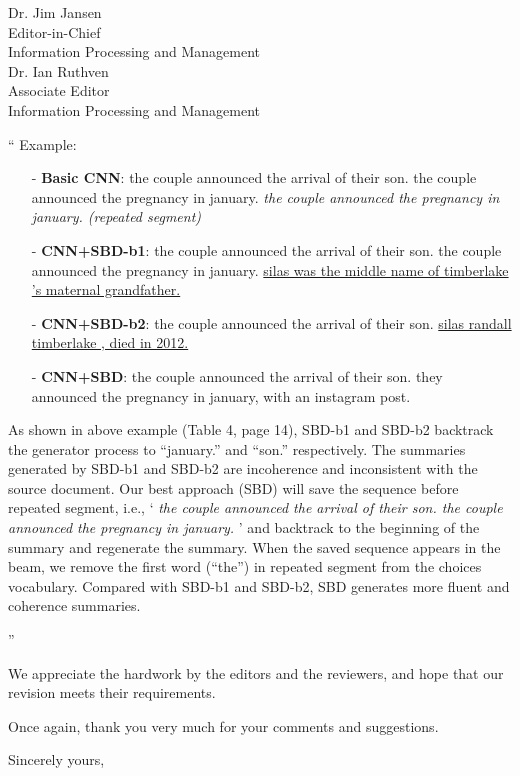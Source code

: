 \documentclass[11pt]{letter} %
\begin{document}
\begin{letter}{Dr. Jim Jansen \\
			Editor-in-Chief  \\
			Information Processing and Management\\
			Dr. Ian Ruthven \\
			Associate Editor \\
			Information Processing and Management}
\begin{enumerate}
\begin{itemize}
				\hspace*{0.6cm}
				``
				Example:
				\begin{itemize}
				\item[-] \textbf{Basic CNN}:
				\small{
				the couple announced the arrival of their son.
			    the couple announced the pregnancy in january.
				\textit{the couple announced the pregnancy in january. (repeated segment)}
				}
				\item[-] \textbf{CNN+SBD-b1}:
				\small{
				the couple announced the arrival of their son.
				the couple announced the pregnancy in january.
				\underline{silas was the middle name of timberlake 's maternal grandfather.}
				}
				\item[-] \textbf{CNN+SBD-b2}:
				\small{
				the couple announced the arrival of their son.
				\underline{silas randall timberlake , died in 2012.}
				}
				\item[-] \textbf{CNN+SBD}:
				\small{
				the couple announced the arrival of their son.
                they announced the pregnancy in january, with an instagram post.
				}
				\end{itemize}

				As shown in above example (Table 4, page 14), 
				SBD-b1 and SBD-b2 backtrack the generator process
				to ``january.'' and ``son.'' respectively.
				The summaries generated by SBD-b1 and SBD-b2 
				are incoherence and inconsistent with the source document.
			    Our best approach (SBD) will save the sequence before repeated segment, i.e., 
				`\textit{
				the couple announced the arrival of their son.
				the couple announced the pregnancy in january.}
				'
				and backtrack to the beginning of the summary and regenerate the summary. 
				When the saved sequence appears in the beam, we remove the first word (``the'') in 
				repeated segment from the choices vocabulary. 
				Compared with SBD-b1 and SBD-b2, SBD generates more fluent and coherence summaries.
				
				''
			\end{itemize}
		\end{enumerate}
	
	
		We appreciate the hardwork by the editors and the reviewers,
		and hope that our revision meets their requirements.
		
		Once again, thank you very much for  your comments and suggestions.
		
		
		\closing{Sincerely yours,}
		
		
		
		
	\end{letter}
	
\end{document}
